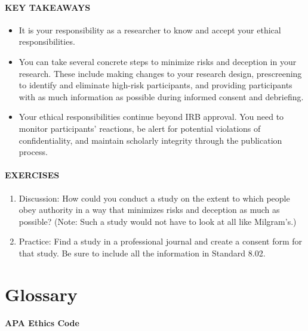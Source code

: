 \documentclass[
]{krantz}
\providecommand{\tightlist}{%
  \setlength{\itemsep}{0pt}\setlength{\parskip}{0pt}}
\begin{document}
\paragraph*{KEY TAKEAWAYS}\label{key-takeaways-24}

\begin{itemize}
\tightlist
\item
  It is your responsibility as a researcher to know and accept your ethical responsibilities.
\item
  You can take several concrete steps to minimize risks and deception in your research. These include making changes to your research design, prescreening to identify and eliminate high-risk participants, and providing participants with as much information as possible during informed consent and debriefing.
\item
  Your ethical responsibilities continue beyond IRB approval. You need to monitor participants' reactions, be alert for potential violations of confidentiality, and maintain scholarly integrity through the publication process.
\end{itemize}

\paragraph*{EXERCISES}\label{exercises-20}

\begin{enumerate}
\def\labelenumi{\arabic{enumi}.}
\tightlist
\item
  Discussion: How could you conduct a study on the extent to which people obey authority in a way that minimizes risks and deception as much as possible? (Note: Such a study would not have to look at all like Milgram's.)
\item
  Practice: Find a study in a professional journal and create a consent form for that study. Be sure to include all the information in Standard 8.02.
\end{enumerate}

\section{Glossary}\label{glossary-8}

\paragraph*{APA Ethics Code}\label{apa-ethics-code-2}
\end{document}

